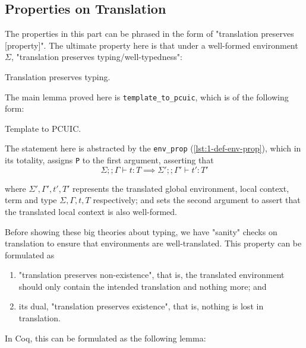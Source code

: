 \subsection*{Properties on Translation}


The properties in this part can be phrased in the form of "translation preserves
[property]". The ultimate property here is that under a well-formed environment
$\Sigma$, "translation preserves typing/well-typedness":

\begin{listing}[H]
  \caption{Translation preserves typing.}
  \label{lst:1-trans-typing}
\end{listing}

The main lemma proved here is \verb|template_to_pcuic|, which is of the
following form:

\begin{listing}[H]
  \caption{Template to PCUIC.}
  \label{lst:1-trans-ttp}
\end{listing}

The statement here is abstracted by the \verb|env_prop|
(\ref{lst:1-def-env-prop}), which in its totality, assigns \verb|P| to the first
argument, asserting that
\[\Sigma ;; \Gamma \vdash t: T \implies \Sigma' ;; \Gamma' \vdash t' : T'\]

where $\Sigma', \Gamma', t', T'$ represents the translated global environment,
local context, term and type $\Sigma, \Gamma, t, T$ respectively; and sets the
second argument to assert that the translated local context is also well-formed.

Before showing these big theories about typing, we have "sanity" checks on
translation to ensure that environments are well-translated. This property can
be formulated as
\begin{enumerate}
  \item "translation preserves non-existence", that is, the translated
  environment should only contain the intended translation and nothing more; and
  \item its dual, "translation preserves existence", that is, nothing is lost in
  translation.
\end{enumerate}
 In Coq, this can be formulated as the following lemma:


